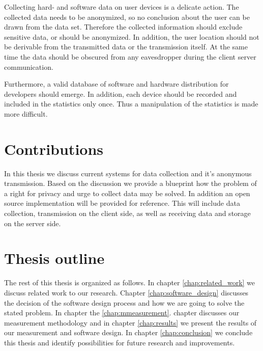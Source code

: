 Collecting hard- and software data on user devices is a delicate action. The collected data needs to be anonymized,
so no conclusion about the user can be drawn from the data set. Therefore the collected information should exclude
sensitive data, or should be anonymized. 
In addition, the user location should not be derivable from the transmitted data or the transmission itself. At the same time the data should be obscured from any eavesdropper during the client server communication.

Furthermore, a valid database of software and hardware distribution for developers should emerge. In addition,
each device should be recorded and included in the statistics only once.
Thus a manipulation of the statistics is made more difficult.



\section{Contributions}
\label{sec:intro:contrib}
%

In this thesis we discuss current systems for data collection and it's anonymous transmission. Based on the discussion we provide a blueprint how the problem of a right for privacy and urge to collect data may be solved.
In addition an open source implementation will be provided for reference.
This will include data collection, transmission on the client side, as well as receiving data and storage on the server side.

\section{Thesis outline}
\label{sec:intro:outline}

The rest of this thesis is organized as follows. In chapter \ref{chap:related_work} we discuss related work to our research. Chapter \ref{chap:software_design} discusses the decision of the software design process and how we are going to solve the stated problem. In chapter 
the \ref{chap:mmeasurement}. chapter discusses our measurement methodology and in chapter \ref{chap:results} we present the results of our measurement and software design. In chapter \ref{chap:conclusion} we conclude this thesis and identify possibilities for future research and improvements.

